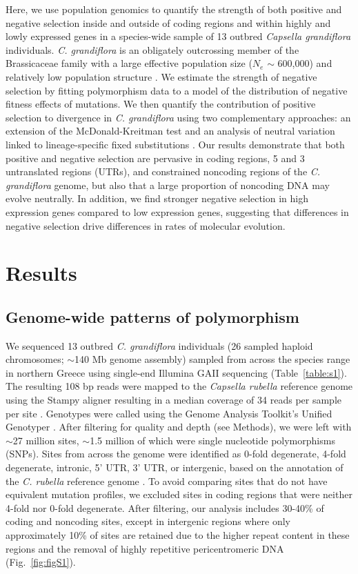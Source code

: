 Here, we use population genomics to quantify the strength of both positive and negative selection inside and outside of coding regions and within highly and lowly expressed genes in a species-wide sample of 13 outbred \textit{Capsella grandiflora} individuals. \textit{C. grandiflora} is an obligately outcrossing member of the Brassicaceae family with a large effective population size ($N_{e}$ $\sim$ 600,000) and relatively low population structure \citep{gossmann2010,St_onge2011-jz}. We estimate the strength of negative selection by fitting polymorphism data to a model of the distribution of negative fitness effects of mutations. We then quantify the contribution of positive selection to divergence in \textit{C. grandiflora} using two complementary approaches: an extension of the McDonald-Kreitman test \citep{Eyre-Walker2009-zt} and an analysis of neutral variation linked to lineage-specific fixed substitutions \citep{sella2009}. Our results demonstrate that both positive and negative selection are pervasive in coding regions, 5\textsc{} and 3\textsc{} untranslated regions (UTRs), and constrained noncoding regions of the \textit{C. grandiflora} genome, but also that a large proportion of noncoding DNA may evolve neutrally. In addition, we find stronger negative selection in high expression genes compared to low expression genes, suggesting that differences in negative selection drive differences in rates of molecular evolution.

\section{Results}
\subsection{Genome-wide patterns of polymorphism}

We sequenced 13 outbred \textit{C. grandiflora} individuals (26 sampled haploid chromosomes; $\sim$140 Mb genome assembly) sampled from across the species\textsc{} range in northern Greece using single-end Illumina GAII sequencing (Table~\ref{table:s1}). The resulting 108 bp reads were mapped to the \textit{Capsella rubella} reference genome \citep{Slotte2013-py} using the Stampy aligner resulting in a median coverage of 34 reads per sample per site \citep{Lunter2011-uc}. Genotypes were called using the Genome Analysis Toolkit’s Unified Genotyper \citep{gatk}. After filtering for quality and depth (see Methods), we were left with $\sim$27 million sites, $\sim$1.5 million of which were single nucleotide polymorphisms (SNPs). Sites from across the genome were identified as 0-fold degenerate, 4-fold degenerate, intronic, 5’ UTR, 3’ UTR, or intergenic, based on the annotation of the \textit{C. rubella} reference genome \citep{Slotte2013-py}. To avoid comparing sites that do not have equivalent mutation profiles, we excluded sites in coding regions that were neither 4-fold nor 0-fold degenerate. After filtering, our analysis includes 30-40\% of coding and noncoding sites, except in intergenic regions where only approximately 10\% of sites are retained due to the higher repeat content in these regions and the removal of highly repetitive pericentromeric DNA (Fig.~\ref{fig:figS1}). 

